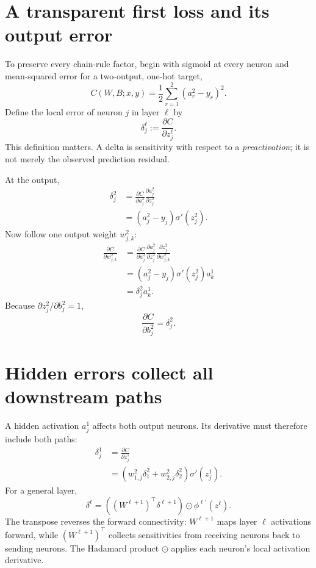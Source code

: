 \section{A transparent first loss and its output error}

To preserve every chain-rule factor, begin with sigmoid at every neuron and
mean-squared error for a two-output, one-hot target,
\[
  C(W,B;x,y)=\frac12\sum_{r=1}^{2}(a_r^2-y_r)^2.
\]
Define the local error of neuron $j$ in layer $\ell$ by
\[
  \delta_j^\ell:=\frac{\partial C}{\partial z_j^\ell}.
\]
This definition matters. A delta is sensitivity with respect to a
\emph{preactivation}; it is not merely the observed prediction residual.

At the output,
\[
\begin{aligned}
\delta_j^2
&=\frac{\partial C}{\partial a_j^2}
  \frac{\partial a_j^2}{\partial z_j^2}\\
&=(a_j^2-y_j)\sigma'(z_j^2).
\end{aligned}
\]
Now follow one output weight $w_{j,k}^2$:
\[
\begin{aligned}
\frac{\partial C}{\partial w_{j,k}^2}
&=\frac{\partial C}{\partial a_j^2}
  \frac{\partial a_j^2}{\partial z_j^2}
  \frac{\partial z_j^2}{\partial w_{j,k}^2}\\
&=(a_j^2-y_j)\sigma'(z_j^2)a_k^1\\
&=\delta_j^2a_k^1.
\end{aligned}
\]
Because $\partial z_j^2/\partial b_j^2=1$,
\[
  \frac{\partial C}{\partial b_j^2}=\delta_j^2.
\]

\section{Hidden errors collect all downstream paths}

A hidden activation $a_j^1$ affects both output neurons. Its derivative must
therefore include both paths:
\[
\begin{aligned}
\delta_j^1
&=\frac{\partial C}{\partial z_j^1}\\
&=\left(
 w_{1,j}^2\delta_1^2+
 w_{2,j}^2\delta_2^2
\right)\sigma'(z_j^1).
\end{aligned}
\]
For a general layer,
\[
  \boxed{
  \delta^\ell
  =
  \left((W^{\ell+1})^\top\delta^{\ell+1}\right)
  \odot\phi^{\ell\prime}(z^\ell)
  }.
\]
The transpose reverses the forward connectivity: $W^{\ell+1}$ maps layer
$\ell$ activations forward, while $(W^{\ell+1})^\top$ collects sensitivities
from receiving neurons back to sending neurons. The Hadamard product
$\odot$ applies each neuron's local activation derivative.

